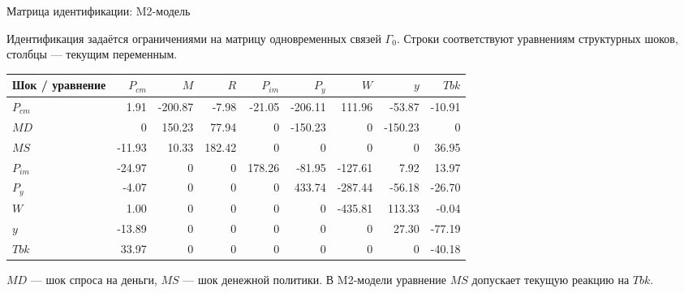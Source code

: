 \begin{frame}[t]{Матрица идентификации: M2-модель}
\footnotesize

Идентификация задаётся ограничениями на матрицу одновременных связей $\Gamma_0$.
Строки соответствуют уравнениям структурных шоков, столбцы --- текущим переменным.

\vspace{0.35em}

\begin{center}
\scriptsize
\setlength{\tabcolsep}{2.8pt}
\renewcommand{\arraystretch}{1.15}

\begin{tabular}{@{}lrrrrrrrr@{}}
\toprule
Шок / уравнение & $P_{cm}$ & $M$ & $R$ & $P_{im}$ & $P_y$ & $W$ & $y$ & $Tbk$ \tabularnewline
\midrule
$P_{cm}$ & 1.91 & -200.87 & -7.98 & -21.05 & -206.11 & 111.96 & -53.87 & -10.91 \tabularnewline
$MD$     & 0 & 150.23 & 77.94 & 0 & -150.23 & 0 & -150.23 & 0 \tabularnewline
$MS$     & -11.93 & 10.33 & 182.42 & 0 & 0 & 0 & 0 & 36.95 \tabularnewline
$P_{im}$ & -24.97 & 0 & 0 & 178.26 & -81.95 & -127.61 & 7.92 & 13.97 \tabularnewline
$P_y$    & -4.07 & 0 & 0 & 0 & 433.74 & -287.44 & -56.18 & -26.70 \tabularnewline
$W$      & 1.00 & 0 & 0 & 0 & 0 & -435.81 & 113.33 & -0.04 \tabularnewline
$y$      & -13.89 & 0 & 0 & 0 & 0 & 0 & 27.30 & -77.19 \tabularnewline
$Tbk$    & 33.97 & 0 & 0 & 0 & 0 & 0 & 0 & -40.18 \tabularnewline
\bottomrule
\end{tabular}
\end{center}

\vspace{0.35em}

\footnotesize
$MD$ --- шок спроса на деньги, $MS$ --- шок денежной политики. В M2-модели уравнение $MS$ допускает текущую реакцию на $Tbk$.

\end{frame}


